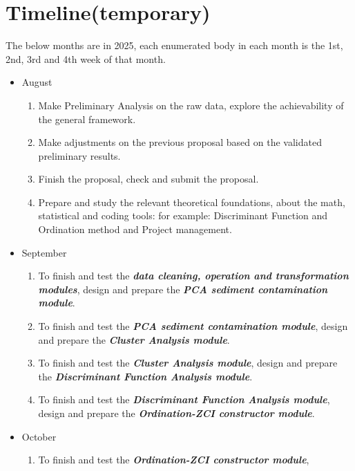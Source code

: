 \section{Timeline(temporary)}

The below months are in 2025, each enumerated body in each month is the 
1st, 2nd, 3rd and 4th week of that month.

\begin{itemize}
    \item August
        \begin{enumerate}
            \item Make Preliminary Analysis on the raw data, explore the achievability of the general framework.
            \item Make adjustments on the previous proposal based on the validated preliminary results.
            \item Finish the proposal, check and submit the proposal.
            \item Prepare and study the relevant theoretical foundations, about the math, statistical and coding tools:
            for example: Discriminant Function and Ordination method and Project management.
        \end{enumerate}
    \item September
        \begin{enumerate}
            \item To finish and test the \textbf{\textit{data cleaning, operation and transformation modules}}, 
            design and prepare the \textbf{\textit{PCA sediment contamination module}}.
            \item To finish and test the \textbf{\textit{PCA sediment contamination module}},
            design and prepare the \textbf{\textit{Cluster Analysis module}}.
            \item To finish and test the \textbf{\textit{Cluster Analysis module}},
            design and prepare the \textbf{\textit{Discriminant Function Analysis module}}.
            \item To finish and test the \textbf{\textit{Discriminant Function Analysis module}},
            design and prepare the \textbf{\textit{Ordination-ZCI constructor module}}. 
        \end{enumerate}
    \item October
        \begin{enumerate}
            \item To finish and test the \textbf{\textit{Ordination-ZCI constructor module}},

\end{enumerate}
\end{itemize}
